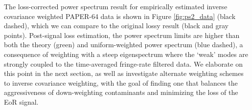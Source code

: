 \documentclass[preprint2,numberedappendix,tighten]{aastex6}  %
\begin{document}

The loss-corrected power spectrum result for empirically estimated inverse covariance weighted PAPER-64 data is shown in Figure \ref{fig:ps2_data} (black dashed), which we can compare to the original lossy result (black and gray points). %
Post-signal loss estimation, the power spectrum limits are higher than both the theory (green) and uniform-weighted power spectrum (blue dashed), a consequence of weighting with a steep eigenspectrum where the `weak' modes are strongly coupled to the time-averaged fringe-rate filtered data. We elaborate on this point in the next section, as well as investigate alternate 
weighting schemes to inverse covariance weighting, with the goal of finding one that balances the aggressiveness of down-weighting contaminants and minimizing the loss of the EoR signal. 
\end{document}
